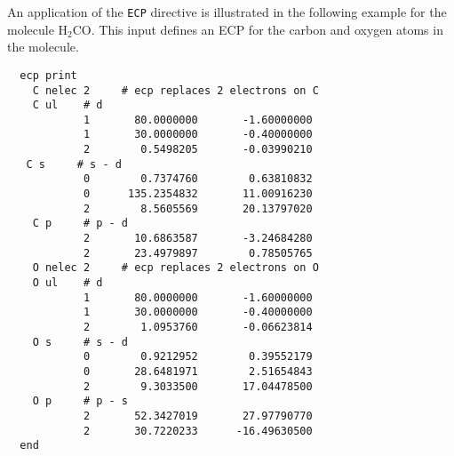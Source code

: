 An application of the \verb+ECP+ directive is illustrated in the
following example for the molecule H$_2$CO.  This input defines an ECP
for the carbon and oxygen atoms in the molecule.


\begin{verbatim}
  ecp print  
    C nelec 2     # ecp replaces 2 electrons on C
    C ul    # d
            1       80.0000000       -1.60000000
            1       30.0000000       -0.40000000
            2        0.5498205       -0.03990210
   C s     # s - d 
            0        0.7374760        0.63810832
            0      135.2354832       11.00916230
            2        8.5605569       20.13797020
    C p     # p - d
            2       10.6863587       -3.24684280
            2       23.4979897        0.78505765
    O nelec 2     # ecp replaces 2 electrons on O
    O ul    # d 
            1       80.0000000       -1.60000000
            1       30.0000000       -0.40000000
            2        1.0953760       -0.06623814
    O s     # s - d
            0        0.9212952        0.39552179
            0       28.6481971        2.51654843
            2        9.3033500       17.04478500
    O p     # p - s 
            2       52.3427019       27.97790770
            2       30.7220233      -16.49630500
  end
\end{verbatim}


